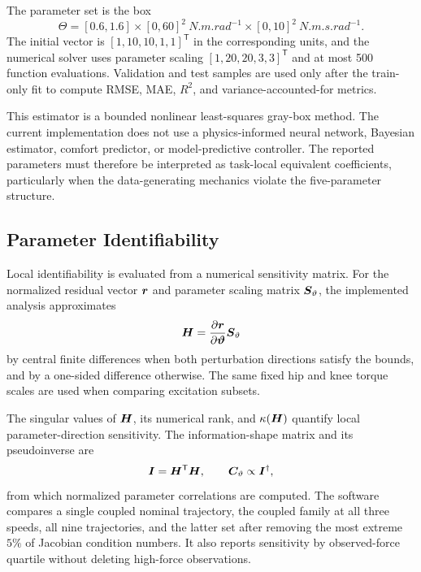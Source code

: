 The parameter set is the box
\begin{equation}
    \Theta=[0.6,1.6]
    \times[0,60]^2\ \si{N.m.rad^{-1}}
    \times[0,10]^2\ \si{N.m.s.rad^{-1}}.
    \label{eq:parameter_bounds}
\end{equation}
The initial vector is
$[1,10,10,1,1]^{\mathsf T}$ in the corresponding units, and the numerical
solver uses parameter scaling $[1,20,20,3,3]^{\mathsf T}$ and at most 500
function evaluations.  Validation and test samples are used only after the
train-only fit to compute RMSE, MAE, $R^2$, and variance-accounted-for metrics.

This estimator is a bounded nonlinear least-squares gray-box method.  The
current implementation does not use a physics-informed neural network,
Bayesian estimator, comfort predictor, or model-predictive controller.  The
reported parameters must therefore be interpreted as task-local equivalent
coefficients, particularly when the data-generating mechanics violate the
five-parameter structure.

\subsection{Parameter Identifiability}
\label{subsec:identifiability}

Local identifiability is evaluated from a numerical sensitivity matrix.  For
the normalized residual vector $\bm{r}$ and parameter scaling matrix
$\bm{S}_{\vartheta}$, the implemented analysis approximates
\begin{equation}
    \bm{H}=
    \frac{\partial\bm{r}}{\partial\bm{\vartheta}}
    \bm{S}_{\vartheta}
    \label{eq:sensitivity_matrix}
\end{equation}
by central finite differences when both perturbation directions satisfy the
bounds, and by a one-sided difference otherwise.  The same fixed hip and knee
torque scales are used when comparing excitation subsets.

The singular values of $\bm{H}$, its numerical rank, and
$\kappa(\bm{H})$ quantify local parameter-direction sensitivity.  The
information-shape matrix and its pseudoinverse are
\begin{equation}
    \bm{I}=\bm{H}^{\mathsf T}\bm{H},
    \qquad
    \bm{C}_{\vartheta}\propto\bm{I}^{\dagger},
    \label{eq:information_matrix}
\end{equation}
from which normalized parameter correlations are computed.  The software
compares a single coupled nominal trajectory, the coupled family at all three
speeds, all nine trajectories, and the latter set after removing the most
extreme $5\%$ of Jacobian condition numbers.  It also reports sensitivity by
observed-force quartile without deleting high-force observations.


